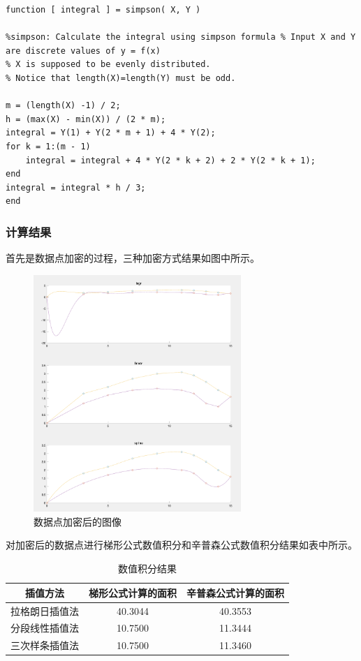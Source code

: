 \documentclass{article}
\begin{document}
\begin{lstlisting}
function [ integral ] = simpson( X, Y )

%simpson: Calculate the integral using simpson formula % Input X and Y are discrete values of y = f(x)
% X is supposed to be evenly distributed.
% Notice that length(X)=length(Y) must be odd.

m = (length(X) -1) / 2;
h = (max(X) - min(X)) / (2 * m);
integral = Y(1) + Y(2 * m + 1) + 4 * Y(2);
for k = 1:(m - 1)
    integral = integral + 4 * Y(2 * k + 2) + 2 * Y(2 * k + 1);
end
integral = integral * h / 3;
end
\end{lstlisting}

\subsubsection{计算结果}

首先是数据点加密的过程，三种加密方式结果如图中所示。
\begin{figure}[htb]
    \centering
    \includegraphics[width=0.7\textwidth]{pic1.png}
    \caption{数据点加密后的图像}
\end{figure}

对加密后的数据点进行梯形公式数值积分和辛普森公式数值积分结果如表中所示。

\begin{table}[htb]
	\centering
	\caption{数值积分结果}
	\begin{tabular}{ccc}
\hline
插值方法 & 梯形公式计算的面积 & 辛普森公式计算的面积 \\
 \hline
拉格朗日插值法 & 40.3044 & 40.3553 \\ 
分段线性插值法 & 10.7500 & 11.3444 \\
三次样条插值法 & 10.7500 & 11.3460 \\
\hline
\end{tabular}
\end{table}
\end{document}
